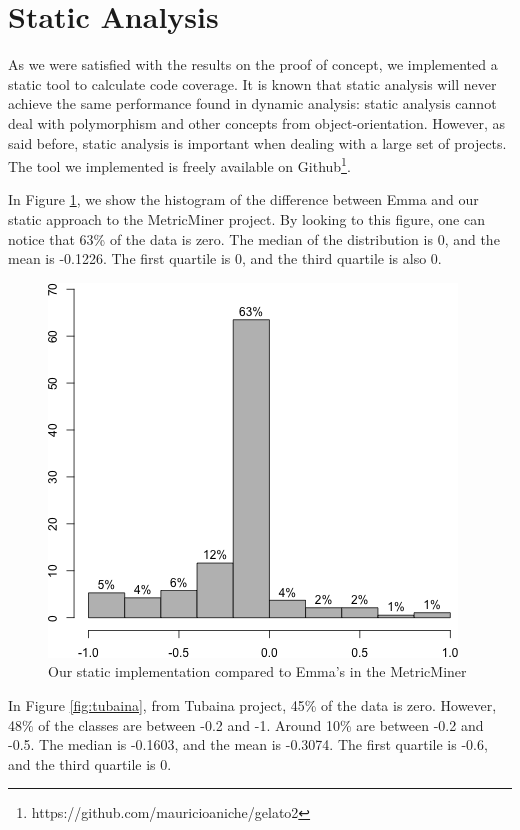 \documentclass{sig-alternate}
\begin{document}
\section{Static Analysis}
\label{sec-results}

As we were satisfied with the results on the proof of concept, we implemented a static tool
to calculate code coverage. It is known that static analysis will never achieve the same performance
found in dynamic analysis: static analysis cannot deal with polymorphism and other concepts from object-orientation.
However, as said before, static analysis is important when dealing with a large set of projects.
The tool we implemented is freely available on Github\footnote{https://github.com/mauricioaniche/gelato2}.

In Figure \ref{fig:metricminer}, we show the histogram of the difference between Emma and our static approach to
the MetricMiner project. By looking to this figure, one can notice that 63\% of the data is zero. 
The median of the distribution is 0, and the mean is -0.1226. The first quartile is 0, and the
third quartile is also 0.

\begin{figure}[h!H]
  \centering
  \includegraphics[scale=0.3]{../stats/metricminer-histograma-gelato.png}
  \caption{Our static implementation compared to Emma's in the MetricMiner}
  \label{fig:metricminer}
\end{figure}

In Figure \ref{fig:tubaina}, from Tubaina project, 45\% of the data is zero. 
However, 48\% of the classes are between -0.2 and -1. Around 10\% are between -0.2 and -0.5.
The median is -0.1603, and the mean is -0.3074. The first quartile is
-0.6, and the third quartile is 0.
\end{document}
